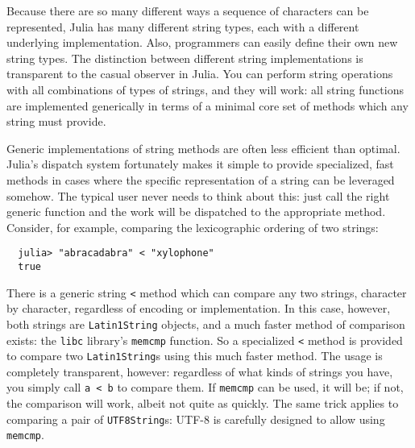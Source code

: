 \documentclass{article}
\begin{document}
Because there are so many different ways a sequence of characters can be represented, Julia has many different string types, each with a different underlying implementation.
Also, programmers can easily define their own new string types.
The distinction between different string implementations is transparent to the casual observer in Julia.
You can perform string operations with all combinations of types of strings, and they will work:
all string functions are implemented generically in terms of a minimal core set of methods which any string must provide.

Generic implementations of string methods are often less efficient than optimal.
Julia's dispatch system fortunately makes it simple to provide specialized, fast methods in cases where the specific representation of a string can be leveraged somehow.
The typical user never needs to think about this:
just call the right generic function and the work will be dispatched to the appropriate method.
Consider, for example, comparing the lexicographic ordering of two strings:
\begin{verbatim}
  julia> "abracadabra" < "xylophone"
  true
\end{verbatim}
There is a generic string \verb|<| method which can compare any two strings, character by character, regardless of encoding or implementation.
In this case, however, both strings are \verb|Latin1String| objects, and a much faster method of comparison exists:
the \verb|libc| library's \verb|memcmp| function.
So a specialized \verb|<| method is provided to compare two \verb|Latin1String|s using this much faster method.
The usage is completely transparent, however:
regardless of what kinds of strings you have, you simply call \verb|a < b| to compare them.
If \verb|memcmp| can be used, it will be;
if not, the comparison will work, albeit not quite as quickly.
The same trick applies to comparing a pair of \verb|UTF8String|s:
UTF-8 is carefully designed to allow using \verb|memcmp|.
\end{document}
